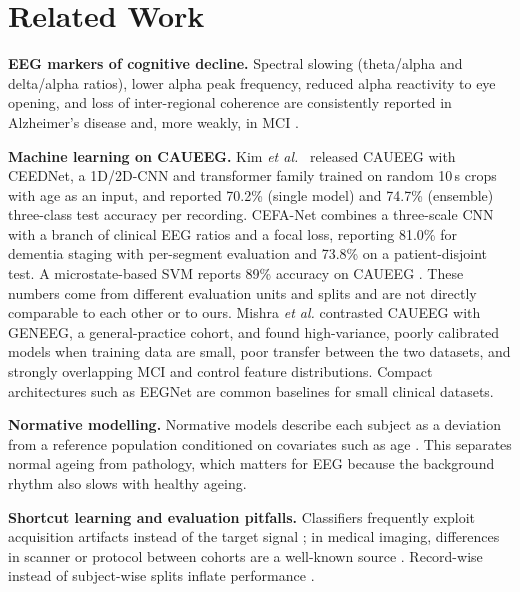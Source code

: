 \documentclass[conference]{IEEEtran}
\begin{document}
\section{Related Work}

\textbf{EEG markers of cognitive decline.} Spectral slowing (theta/alpha and delta/alpha ratios),
lower alpha peak frequency, reduced alpha reactivity to eye opening, and loss of inter-regional
coherence are consistently reported in Alzheimer's disease and, more weakly, in MCI
\cite{jeong2004eeg,dauwels2010diagnosis,babiloni2020measures}.

\textbf{Machine learning on CAUEEG.} Kim \textit{et al.}~\cite{kim2023caueeg} released CAUEEG with
CEEDNet, a 1D/2D-CNN and transformer family trained on random 10\,s crops with age as an input, and
reported 70.2\% (single model) and 74.7\% (ensemble) three-class test accuracy per recording. CEFA-Net
\cite{cefanet2026} combines a three-scale CNN with a branch of clinical EEG ratios and a focal loss,
reporting 81.0\% for dementia staging with per-segment evaluation and 73.8\% on a patient-disjoint
test. A microstate-based SVM reports 89\% accuracy on CAUEEG \cite{hasan2025msaf}. These numbers come
from different evaluation units and splits and are not directly comparable to each other or to ours.
Mishra \textit{et al.} \cite{geneeg2025} contrasted CAUEEG with GENEEG, a general-practice cohort, and
found high-variance, poorly calibrated models when training data are small, poor transfer between the
two datasets, and strongly overlapping MCI and control feature distributions. Compact architectures
such as EEGNet \cite{lawhern2018eegnet} are common baselines for small clinical datasets.

\textbf{Normative modelling.} Normative models describe each subject as a deviation from a reference
population conditioned on covariates such as age \cite{marquand2016normative}. This separates normal
ageing from pathology, which matters for EEG because the background rhythm also slows with healthy
ageing.

\textbf{Shortcut learning and evaluation pitfalls.} Classifiers frequently exploit acquisition
artifacts instead of the target signal \cite{geirhos2020shortcut}; in medical imaging, differences in
scanner or protocol between cohorts are a well-known source \cite{roberts2021pitfalls,varoquaux2022machine}.
Record-wise instead of subject-wise splits inflate performance \cite{saeb2017voice}.
\end{document}
